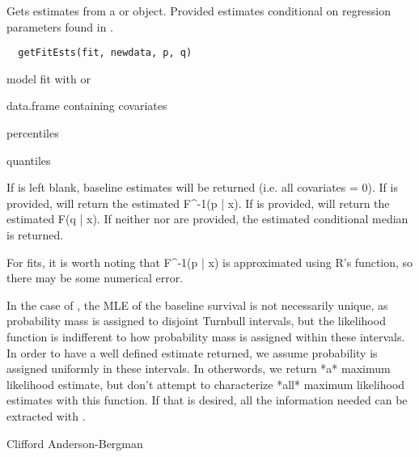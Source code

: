 \documentclass[a4paper]{book}
\begin{document}
%
\begin{Description}\relax
 Gets estimates from a  or  object. Provided estimates conditional on regression parameters found in .
\end{Description}
%
\begin{Usage}
\begin{verbatim}
  getFitEsts(fit, newdata, p, q) 
\end{verbatim}
\end{Usage}
%
\begin{Arguments}
\begin{ldescription}
\item[\code{fit}] model fit with  or 
\item[\code{newdata}] data.frame containing covariates
\item[\code{p}] percentiles
\item[\code{q}] quantiles
\end{ldescription}
\end{Arguments}
%
\begin{Details}\relax
 	
If  is left blank, baseline estimates will be returned (i.e. all covariates = 0). If  is provided, will return the estimated F\textasciicircum{}-1(p | x). If  is provided, will return the estimated F(q | x). If neither  nor  are provided, the estimated conditional median is returned.

For  fits, it is worth noting that F\textasciicircum{}-1(p | x) is approximated using R's  function, so there may be some numerical error. 

In the case of , the MLE of the baseline survival is not necessarily unique, as probability mass is assigned to disjoint Turnbull intervals, but the likelihood function is indifferent to how probability mass is assigned within these intervals. In order to have a well defined estimate returned, we assume probability is assigned uniformly in these intervals. In otherwords, we return *a* maximum likelihood estimate, but don't attempt to characterize *all* maximum likelihood estimates with this function. If that is desired, all the information needed can be extracted with . 
\end{Details}
%
\begin{Author}\relax
Clifford Anderson-Bergman
\end{Author}
\end{document}
